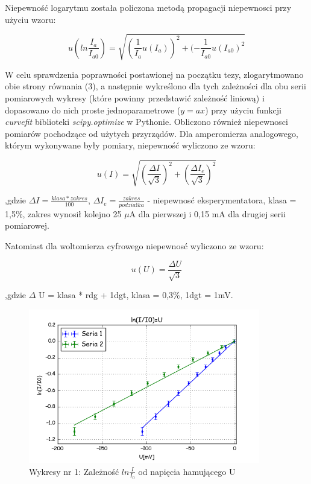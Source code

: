 \documentclass[a4paper,10pt]{article}
\begin{document}
\vspace{1cm}
Niepewność logarytmu została policzona metodą propagacji niepewnosci przy użyciu wzoru:

\begin{equation}
u(ln{\frac{I_a}{I_{a0}}}) = \sqrt{(\frac{1}{I_a} u(I_a))^2 + (-\frac{1}{I_{a0}} u(I_{a0})^2}
\end{equation}

W celu sprawdzenia poprawności postawionej na początku tezy, zlogarytmowano obie strony równania (3), a następnie wykreślono dla tych  zależności dla obu serii pomiarowych wykresy (które powinny przedstawić zależność liniową) i dopasowano do nich proste jednoparametrowe ($y=ax$) przy użyciu funkcji \emph{curvefit} biblioteki \emph{scipy.optimize} w Pythonie. Obliczono również niepewnosci pomiarów pochodzące od użytych przyrządów. Dla amperomierza analogowego, którym wykonywane były pomiary,  niepewność wyliczono ze wzoru:

\begin{equation}
u(I) = \sqrt{(\frac{\Delta I}{\sqrt{3}})^2 + (\frac{\Delta I_e}{\sqrt{3}})^2}
\end{equation}

,gdzie $\Delta I = \frac{klasa*zakres}{100}$, $\Delta I_e = \frac{zakres}{podziałka}$ - niepewnosć eksperymentatora, klasa = 1,5\%, zakres wynosił kolejno 25 $\mu$A dla pierwszej i 0,15 mA dla drugiej serii pomiarowej.

\vspace{0,4cm}
Natomiast dla woltomierza cyfrowego niepewnosć wyliczono ze wzoru:

\begin{equation}
u(U) = \frac{\Delta U}{\sqrt{3}}
\end{equation}

,gdzie $\Delta$ U = klasa * rdg + 1dgt, klasa = 0,3\%, 1dgt = 1mV.

\begin{figure}[H]
\centering
\includegraphics[width=0.9\textwidth]{zarzenie.png}
\caption{Wykresy nr 1: Zależność $ln{\frac{I}{I_0}}$ od napięcia hamującego U}
\end{figure}
\end{document}
